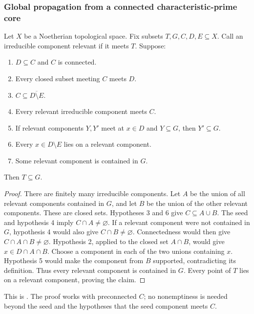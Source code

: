 \subsubsection{Global propagation from a connected characteristic-prime core}
\begin{srlemma}\label{lem:sr-global-propagation}
Let $X$ be a Noetherian topological space. Fix subsets
$T,G,C,D,E\subseteq X$.
Call an irreducible component relevant if it meets $T$.
Suppose:
\begin{enumerate}
\item $D\subseteq C$ and $C$ is connected.
\item Every closed subset meeting $C$ meets $D$.
\item $C\subseteq\overline{D\setminus E}$.
\item Every relevant irreducible component meets $C$.
\item If relevant components $Y,Y'$ meet at $x\in D$ and $Y\subseteq G$,
then $Y'\subseteq G$.
\item Every $x\in D\setminus E$ lies on a relevant component.
\item Some relevant component is contained in $G$.
\end{enumerate}
Then $T\subseteq G$.
\end{srlemma}
\begin{proof}
There are finitely many irreducible components.
Let $A$ be the union of all relevant components contained in $G$, and
let $B$ be the union of the other relevant components.
These are closed sets. Hypotheses 3 and 6 give
$C\subseteq A\cup B$.
The seed and hypothesis 4 imply $C\cap A\ne\varnothing$.
If a relevant component were not contained in $G$, hypothesis 4
would also give $C\cap B\ne\varnothing$.
Connectedness would then give $C\cap A\cap B\ne\varnothing$.
Hypothesis 2, applied to the closed set $A\cap B$, would give
$x\in D\cap A\cap B$.
Choose a component in each of the two unions containing $x$.
Hypothesis 5 would make the component from $B$ supported,
contradicting its definition.
Thus every relevant component is contained in $G$.
Every point of $T$ lies on a relevant component, proving the claim.
\end{proof}
This is
\href{https://github.com/ChristianKudeba/alpoge-rh-verification/blob/alpoge-source-7cbf7a0c/src/Development/AutomorphicArithmetic/AutomorphicVarieties/CurveDVRSpecialization/GlobProp.lean}
{}.
The proof works with preconnected $C$; no nonemptiness is needed beyond
the seed and the hypotheses that the seed component meets $C$.

